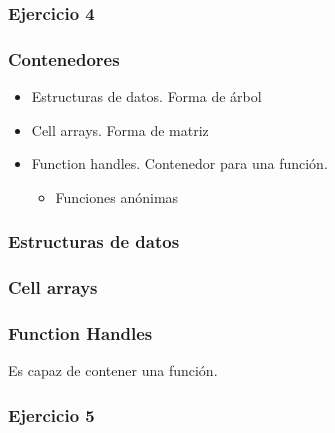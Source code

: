 \documentclass[12pt]{beamer}
\begin{document}
\begin{large}
\begin{frame}
\frametitle{Ejercicio 4}
\end{frame}

\begin{frame}
\frametitle{Contenedores}
\begin{itemize}
\item Estructuras de datos. Forma de árbol
\item Cell arrays. Forma de matriz
\item Function handles. Contenedor para una función.
\begin{itemize}
  \item Funciones anónimas
\end{itemize}
\end{itemize}
\end{frame}



\begin{frame}
\frametitle{Estructuras de datos}
\testcode
\end{frame}


\begin{frame}
\frametitle{Cell arrays}
\testcode
\end{frame}


\begin{frame}
\frametitle{Function Handles}
Es capaz de contener una función.
\testcode
\end{frame}

\begin{frame}
\frametitle{Ejercicio 5}
\end{frame}



\end{large}
\end{document}
